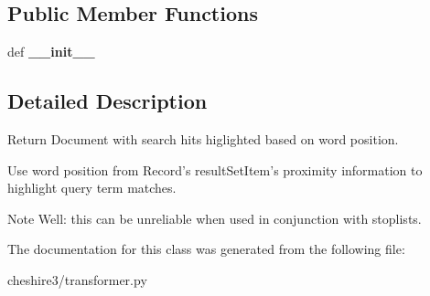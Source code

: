 \subsection*{Public Member Functions}
\begin{DoxyCompactItemize}
\item 
\hypertarget{classcheshire3_1_1transformer_1_1_lxml_position_query_term_highlighting_transformer_aec436c657527bc00065513951f41e628}{def {\bfseries \-\_\-\-\_\-init\-\_\-\-\_\-}}\label{classcheshire3_1_1transformer_1_1_lxml_position_query_term_highlighting_transformer_aec436c657527bc00065513951f41e628}

\end{DoxyCompactItemize}


\subsection{Detailed Description}
\begin{DoxyVerb}Return Document with search hits higlighted based on word position.

Use word position from Record's resultSetItem's proximity information to
highlight query term matches.

Note Well: this can be unreliable when used in conjunction with stoplists.
\end{DoxyVerb}
 

The documentation for this class was generated from the following file\-:\begin{DoxyCompactItemize}
\item 
cheshire3/transformer.\-py\end{DoxyCompactItemize}
